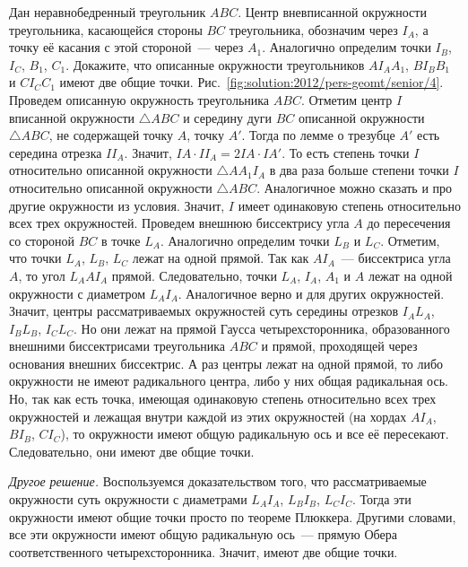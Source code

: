 \problem
Дан неравнобедренный треугольник $ABC$.
Центр вневписанной окружности треугольника, касающейся стороны $BC$
треугольника, обозначим через $I_A$, а точку её касания с этой стороной~---
через $A_1$.
Аналогично определим точки $I_B$, $I_C$, $B_1$, $C_1$.
Докажите, что описанные окружности треугольников
$A I_A A_1$, $B I_B B_1$ и $C I_C C_1$ имеют две общие точки.
%
\label{solution:2012/pers-geomt/senior/4}%
Рис.~\ref{fig:solution:2012/pers-geomt/senior/4}.
Проведем описанную окружность треугольника $ABC$.
Отметим центр $I$ вписанной окружности $\triangle ABC$ и середину дуги $BC$
описанной окружности $\triangle ABC$, не содержащей точку $A$, точку $A'$.
Тогда по лемме о трезубце $A'$ есть середина отрезка $I I_A$.
Значит, $I A \cdot I I_A = 2 I A \cdot I A'$.
То есть степень точки $I$ относительно описанной окружности
$\triangle A A_1 I_A$ в два раза больше степени точки $I$ относительно описанной
окружности $\triangle ABC$.
Аналогичное можно сказать и про другие окружности из условия.
Значит, $I$ имеет одинаковую степень относительно всех трех окружностей.
Проведем внешнюю биссектрису угла $A$ до пересечения со стороной $BC$ в
точке $L_A$.
Аналогично определим точки $L_B$ и $L_C$.
Отметим, что точки $L_A$, $L_B$, $L_C$ лежат на одной прямой.
Так как $AI_A$~--- биссектриса угла $A$, то угол $L_AAI_A$ прямой.
Следовательно, точки $L_A$, $I_A$, $A_1$ и $A$ лежат на одной окружности с
диаметром $L_AI_A$.
Аналогичное верно и для других окружностей.
Значит, центры рассматриваемых окружностей суть середины отрезков
$I_A L_A$, $I_B L_B$, $I_C L_C$.
Но они лежат на прямой Гаусса четырехсторонника, образованного внешними
биссектрисами треугольника $ABC$ и прямой, проходящей через основания внешних
биссектрис.
А раз центры лежат на одной прямой, то либо окружности не имеют радикального
центра, либо у них общая радикальная ось.
Но, так как есть точка, имеющая одинаковую степень относительно всех трех
окружностей и лежащая внутри каждой из этих окружностей
(на хордах $A I_A$, $B I_B$, $C I_C$),
то окружности имеют общую радикальную ось и все её пересекают.
Следовательно, они имеют две общие точки.
\par
\emph{Другое решение.}
Воспользуемся доказательством того, что рассматриваемые окружности суть
окружности с диаметрами $L_A I_A$, $L_B I_B$, $L_C I_C$.
Тогда эти окружности имеют общие точки просто по теореме Плюккера.
Другими словами, все эти окружности имеют общую радикальную ось~---
прямую Обера соответственного четырехсторонника.
Значит, имеют две общие точки.
\endproblem
